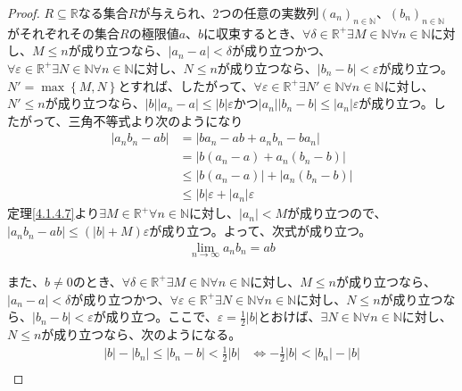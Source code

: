 \documentclass[dvipdfmx]{jsarticle}
\begin{document}
\begin{proof}
$R \subseteq \mathbb{R}$なる集合$R$が与えられ、2つの任意の実数列$\left( a_{n} \right)_{n \in \mathbb{N}}$、$\left( b_{n} \right)_{n \in \mathbb{N}}$がそれぞれその集合$R$の極限値$a$、$b$に収束するとき、$\forall\delta \in \mathbb{R}^{+}\exists M \in \mathbb{N}\forall n \in \mathbb{N}$に対し、$M \leq n$が成り立つなら、$\left| a_{n} - a \right| < \delta$が成り立つかつ、$\forall\varepsilon \in \mathbb{R}^{+}\exists N \in \mathbb{N}\forall n \in \mathbb{N}$に対し、$N \leq n$が成り立つなら、$\left| b_{n} - b \right| < \varepsilon$が成り立つ。$N' = \max\left\{ M,N \right\}$とすれば、したがって、$\forall\varepsilon \in \mathbb{R}^{+}\exists N' \in \mathbb{N}\forall n \in \mathbb{N}$に対し、$N' \leq n$が成り立つなら、$|b|\left| a_{n} - a \right| \leq |b|\varepsilon$かつ$\left| a_{n} \right|\left| b_{n} - b \right| \leq \left| a_{n} \right|\varepsilon$が成り立つ。したがって、三角不等式より次のようになり
\begin{align*}
\left| a_{n}b_{n} - ab \right| &= \left| ba_{n} - ab + a_{n}b_{n} - ba_{n} \right|\\
&= \left| b\left( a_{n} - a \right) + a_{n}\left( b_{n} - b \right) \right|\\
&\leq \left| b\left( a_{n} - a \right) \right| + \left| a_{n}\left( b_{n} - b \right) \right|\\
&\leq |b|\varepsilon + \left| a_{n} \right|\varepsilon
\end{align*}
定理\ref{4.1.4.7}より$\exists M \in \mathbb{R}^{+}\forall n \in \mathbb{N}$に対し、$\left| a_{n} \right| < M$が成り立つので、$\left| a_{n}b_{n} - ab \right| \leq \left( |b| + M \right)\varepsilon$が成り立つ。よって、次式が成り立つ。
\begin{align*}
\lim_{n \rightarrow \infty}{a_{n}b_{n}} = ab
\end{align*}\par
また、$b \neq 0$のとき、$\forall\delta \in \mathbb{R}^{+}\exists M \in \mathbb{N}\forall n \in \mathbb{N}$に対し、$M \leq n$が成り立つなら、$\left| a_{n} - a \right| < \delta$が成り立つかつ、$\forall\varepsilon \in \mathbb{R}^{+}\exists N \in \mathbb{N}\forall n \in \mathbb{N}$に対し、$N \leq n$が成り立つなら、$\left| b_{n} - b \right| < \varepsilon$が成り立つ。ここで、$\varepsilon = \frac{1}{2}|b|$とおけば、$\exists N \in \mathbb{N}\forall n \in \mathbb{N}$に対し、$N \leq n$が成り立つなら、次のようになる。
\begin{align*}
|b| - \left| b_{n} \right| \leq \left| b_{n} - b \right| < \frac{1}{2}|b| &\Leftrightarrow - \frac{1}{2}|b| < \left| b_{n} \right| - |b|\\

\end{align*}
\end{proof}
\end{document}
